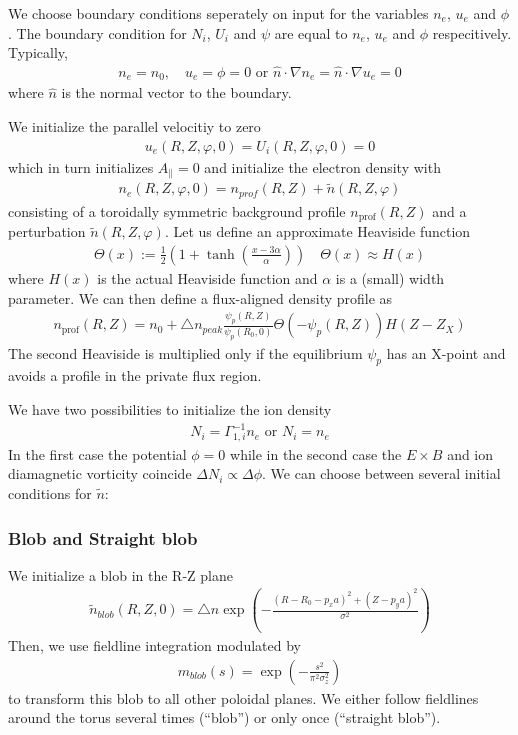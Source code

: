 We choose boundary conditions seperately on input for the variables
$n_e$, $u_e$ and $\phi$. The boundary condition for $N_i$, $U_i$ and
$\psi$ are equal to $n_e$, $u_e$ and $\phi$ respecitively.
Typically,
\begin{align}
n_e = n_0, \quad u_e = \phi = 0
\text{ or } \hat n \cdot \nabla n_e = \hat n \cdot \nabla u_e = 0
\end{align}
where $\hat n$ is the normal vector to the boundary.

We initialize the parallel velocitiy to zero
\begin{align}
  u_e(R,Z,\varphi,0) = U_i(R,Z,\varphi,0) = 0
  \label{}
\end{align}
which in turn initializes $A_\parallel = 0$
and initialize the electron density with
\begin{align} \label{eq:initial_ne}
    n_e(R,Z,\varphi, 0)= n_{prof}(R,Z) + \tilde n(R,Z,\varphi)
\end{align}
consisting of a toroidally symmetric background profile $n_{\text{prof}}(R,Z)$ and a perturbation
$\tilde n(R,Z,\varphi)$.
Let us define an approximate Heaviside function
\begin{align}
  \Theta(x) := \frac{1}{2}\left( 1 + \tanh\left( \frac{x-3\alpha}{ \alpha} \right) \right) \quad \Theta(x) \approx H(x)
  \label{eq:heaviside_profile}
\end{align}
where $H(x)$ is the actual Heaviside function and
$\alpha$ is a (small) width parameter.
We can then define a flux-aligned density profile as
\begin{align} \label{eq:density_profile}
  n_{\text{prof}}(R,Z)=
      n_0 + \triangle n_{peak}\frac{\psi_p(R,Z)}{\psi_p(R_0, 0)} \Theta( -\psi_p(R,Z)) H(Z-Z_X)
\end{align}
The second Heaviside is multiplied only if the equilibrium $\psi_p$ has an
X-point and avoids a profile in the private flux region.

We have two possibilities to initialize the ion density
\begin{align} \label{eq:initphi}
  N_i = \Gamma_{1,i}^{-1} n_e \text{ or } N_i = n_e
\end{align}
In the first case the potential $\phi= 0$ while in the second case
the $E\times B$ and ion diamagnetic vorticity coincide $\Delta N_i \propto \Delta \phi$.
We can choose between several initial conditions for $\tilde n$:

\subsubsection{Blob and Straight blob}
We initialize a blob in the R-Z plane
\begin{align} \label{eq:initial_blob}
  \tilde n_{blob}(R,Z,0) = \triangle n \exp\left( -\frac{(R - R_0 - p_x a)^2 + (Z-p_ya)^2}{\sigma^2} \right)
\end{align}
Then, we use fieldline integration modulated by 
\begin{align}
  m_{blob}(s) = \exp\left( -\frac{s^2 }{\pi^2\sigma_z^2} \right)
\end{align}
to transform this blob to all other poloidal
planes.
We either follow fieldlines around the torus several times (``blob'') or only once
(``straight blob'').
